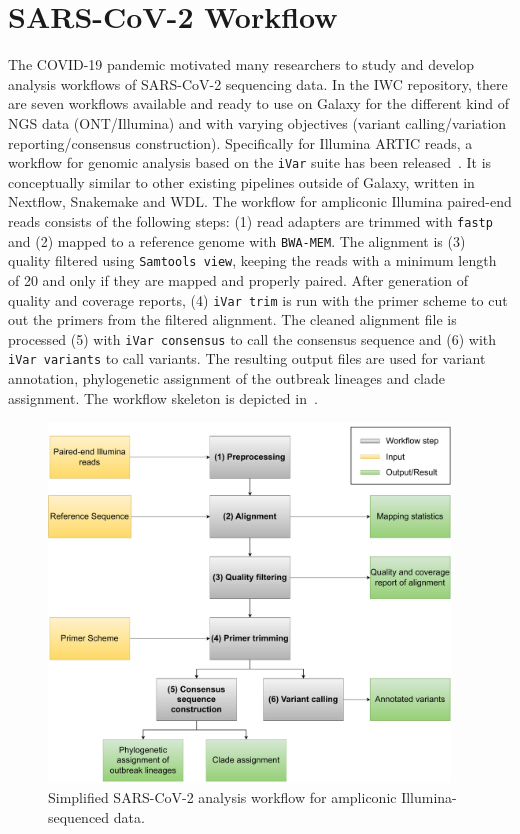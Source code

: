 \section{SARS-CoV-2 Workflow}
The \ac{COVID-19} pandemic motivated many researchers to study and develop analysis workflows of \ac{SARS-CoV-2} sequencing data. In the \ac{IWC} repository, there are seven workflows available and ready to use on Galaxy for the different kind of \ac{NGS} data (ONT/Illumina) and with varying objectives (variant calling/variation reporting/consensus construction). Specifically for Illumina ARTIC reads, a workflow for genomic analysis based on the \texttt{iVar} suite has been released~\cite{iwc2021covidivar}. It is conceptually similar to other existing pipelines outside of Galaxy, written in Nextflow, Snakemake and \ac{WDL}. The workflow for ampliconic Illumina paired-end reads consists of the following steps: (1) read adapters are trimmed with \texttt{fastp} and (2) mapped to a reference genome with \texttt{BWA-MEM}. The alignment is (3) quality filtered using \texttt{Samtools view}, keeping the reads with a minimum length of 20 and only if they are mapped and properly paired. After generation of quality and coverage reports, (4) \texttt{iVar trim} is run with the primer scheme to cut out the primers from the filtered alignment. The cleaned alignment file is processed (5) with \texttt{iVar consensus} to call the consensus sequence and (6) with \texttt{iVar variants} to call variants. The resulting output files are used for variant annotation, phylogenetic assignment of the outbreak lineages and clade assignment. The workflow skeleton is depicted in~. 

\begin{figure}[h!]
	\includegraphics[width=0.95\textwidth]{media/3-sars-cov-2.pdf}
	\caption{Simplified SARS-CoV-2 analysis workflow for ampliconic Illumina-sequenced data.}
	\label{fig:3-sars-wf}
\end{figure}

